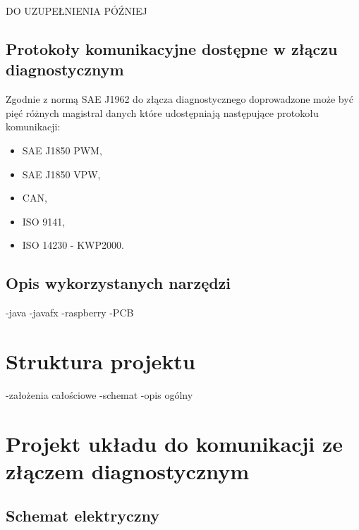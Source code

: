 \documentclass[12pt]{article} %
\numberwithin{equation}{subsection}
\numberwithin{figure}{section}
\numberwithin{table}{section}
\begin{document}
		DO UZUPEŁNIENIA PÓŹNIEJ	
	
		\newpage	
	
	\subsection{Protokoły komunikacyjne dostępne w złączu diagnostycznym}
		\hspace{0.5cm}Zgodnie z normą SAE J1962 do złącza diagnostycznego doprowadzone może być pięć różnych magistral danych które udostępniają następujące protokołu komunikacji:
		
		\begin{itemize}
			\item{SAE J1850 PWM,}
			\item{SAE J1850 VPW,}
			\item{CAN,}
			\item{ISO 9141,}
			\item{ISO 14230 - KWP2000.}
		\end{itemize}
		
		
	
		\newpage	
	
	\subsection{Opis wykorzystanych narzędzi}
		\hspace{0.5cm}
		-java
		-javafx
		-raspberry
		-PCB
	
		\newpage
	
\section{Struktura projektu}
	\hspace{0.5cm}
	-założenia całościowe
	-schemat
	-opis ogólny	
	
	\newpage	
	
\section{Projekt układu do komunikacji ze złączem diagnostycznym}
	\subsection{Schemat elektryczny}
		\hspace{0.5cm}
	
\end{document}

